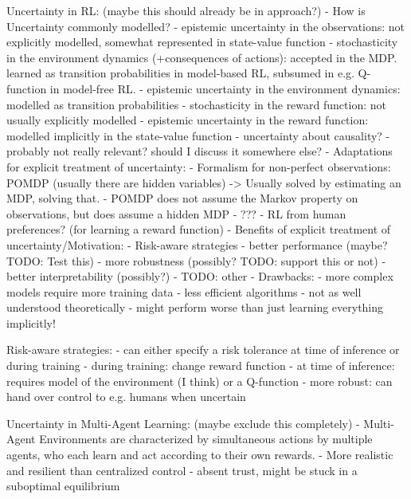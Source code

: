 Uncertainty in RL: (maybe this should already be in approach?)
- How is Uncertainty commonly modelled?
    - epistemic uncertainty in the observations: not explicitly modelled, somewhat represented in state-value function
    - stochasticity in the environment dynamics (+consequences of actions): accepted in the MDP. learned as transition probabilities in model-based RL, subsumed in e.g. Q-function in model-free RL.
    - epistemic uncertainty in the environment dynamics: modelled as transition probabilities
    - stochasticity in the reward function: not usually explicitly modelled
    - epistemic uncertainty in the reward function: modelled implicitly in the state-value function
    - uncertainty about causality? - probably not really relevant? should I discuss it somewhere else?
- Adaptations for explicit treatment of uncertainty:
    - Formalism for non-perfect observations: POMDP (usually there are hidden variables) -> Usually solved by estimating an MDP, solving that.
        - POMDP does not assume the Markov property on observations, but does assume a hidden MDP
    - ???
    - RL from human preferences? (for learning a reward function)
- Benefits of explicit treatment of uncertainty/Motivation:
    - Risk-aware strategies
    - better performance (maybe? TODO: Test this)
    - more robustness (possibly? TODO: support this or not)
    - better interpretability (possibly?)
    - TODO: other
- Drawbacks:
    - more complex models require more training data
    - less efficient algorithms
    - not as well understood theoretically
    - might perform worse than just learning everything implicitly!
    
Risk-aware strategies:
    - can either specify a risk tolerance at time of inference or during training
    - during training: change reward function
    - at time of inference: requires model of the environment (I think) or a Q-function
    - more robust: can hand over control to e.g. humans when uncertain
    
Uncertainty in Multi-Agent Learning: (maybe exclude this completely)
    - Multi-Agent Environments are characterized by simultaneous actions by multiple agents, who each learn and act according to their own rewards.
    - More realistic and resilient than centralized control
    - absent trust, might be stuck in a suboptimal equilibrium



  